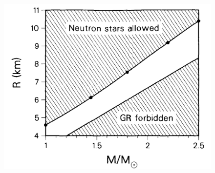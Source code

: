 \begin{frame}
\begin{columns}
\begin{column}{0.33\textwidth}
\begin{figure}
		\includegraphics[width=0.9\linewidth]{./images/ns-mass-radius.png}
	\end{figure}
\end{column}
\end{columns}

\end{frame}